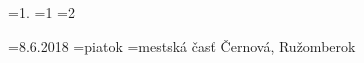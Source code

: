 \rocnik={1.}              %
\kolo={1}      %
\sezona={2}          %

\termin={8.6.2018}
\den={piatok}
\miesto={mests\-ká časť Čer\-no\-vá, Ru\-žom\-be\-rok}
